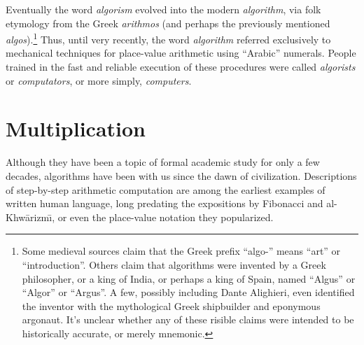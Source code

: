 Eventually the word \textit{algorism} evolved into the modern \textit{algorithm}, via folk etymology from the Greek \textit{arithmos} (and perhaps the previously mentioned \textit{algos}).\footnote{Some medieval sources claim that the Greek prefix “algo-” means “art” or “introduction”. Others claim that algorithms were invented by a Greek philosopher, or a king of India, or perhaps a king of Spain, named “Algus” or “Algor” or “Argus”. A few, possibly including Dante Alighieri, even identified the inventor with the mythological Greek shipbuilder and eponymous argonaut. It’s unclear whether any of these risible claims were intended to be historically accurate, or merely mnemonic.} Thus, until very recently, the word \textit{algorithm} referred exclusively to mechanical techniques for place-value arithmetic using “Arabic” numerals. People trained in the fast and reliable execution of these procedures were called \textit{algorists} or \textit{computators}, or more simply, \textit{computers}.

\section{Multiplication}
\label{sec:0.2}

Although they have been a topic of formal academic study for only a few decades, algorithms have been with us since the dawn of civilization. Descriptions of step-by-step arithmetic computation are among the earliest examples of written human language, long predating the expositions by Fibonacci and al-Khw\=arizm\=\i, or even the place-value notation they popularized.

